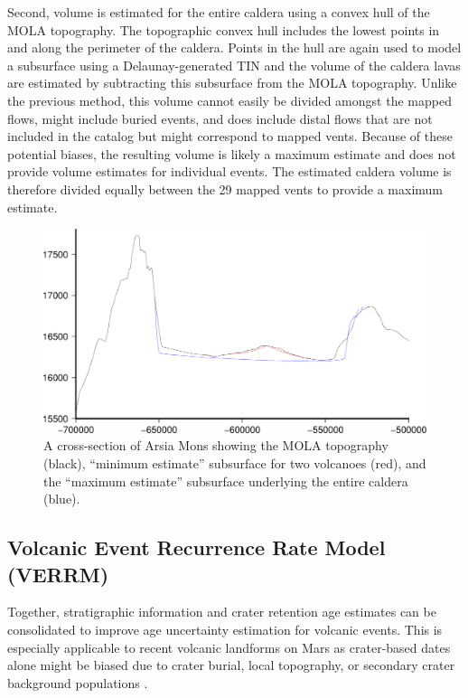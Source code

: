 \documentclass[12pt,letter]{article}
\begin{document}
Second, volume is estimated for the entire caldera using a convex hull of the MOLA topography. The topographic convex hull includes the lowest points in and along the perimeter of the caldera. Points in the hull are again used to model a subsurface using a Delaunay-generated TIN and the volume of the caldera lavas are estimated by subtracting this subsurface from the MOLA topography. Unlike the previous method, this volume cannot easily be divided amongst the mapped flows, might include buried events, and does include distal flows that are not included in the catalog but might correspond to mapped vents. Because of these potential biases, the resulting volume is likely a maximum estimate and does not provide volume estimates for individual events. The estimated caldera volume is therefore divided equally between the 29 mapped vents to provide a maximum estimate.

\begin{figure}
\centering
\includegraphics[width=0.6\linewidth]{figures/vol_estimation_cross.png}
\caption{A cross-section of Arsia Mons showing the MOLA topography (black), ``minimum estimate'' subsurface for two volcanoes (red), and the ``maximum estimate'' subsurface underlying the entire caldera (blue).}
\label{fig_crosssection}
\end{figure}

\subsection{Volcanic Event Recurrence Rate Model (VERRM)}

Together, stratigraphic information and crater retention age estimates can be consolidated to improve age uncertainty estimation for volcanic events. This is especially applicable to recent volcanic landforms on Mars as crater-based dates alone might be biased due to crater burial, local topography, or secondary crater background populations \citep{robbins2011volcanic,platz2011eruption}.
\end{document}
